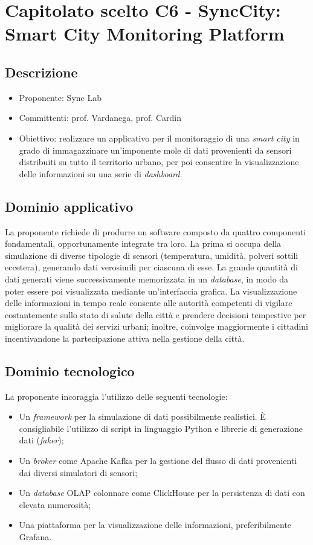 \section{Capitolato scelto C6 - SyncCity: Smart City Monitoring Platform}
\subsection{Descrizione}
\begin{itemize}
    \setlength\itemsep{0em}
    \item Proponente: Sync Lab
    \item Committenti: prof. Vardanega, prof. Cardin
    \item Obiettivo: realizzare un applicativo per il monitoraggio di una \textit{smart city} in grado di immagazzinare un'imponente mole di dati provenienti da sensori distribuiti su tutto il territorio urbano, per poi consentire la visualizzazione delle informazioni su una serie di \textit{dashboard}.
\end{itemize}

\subsection{Dominio applicativo}
La proponente richiede di produrre un software composto da quattro componenti fondamentali, opportunamente integrate tra loro. La prima si occupa della simulazione di diverse tipologie di sensori (temperatura, umidità, polveri sottili eccetera), generando dati verosimili per ciascuna di esse. La grande quantità di dati generati viene successivamente memorizzata in un \textit{database}, in modo da poter essere poi visualizzata mediante un'interfaccia grafica. La visualizzazione delle informazioni in tempo reale consente alle autorità competenti di vigilare costantemente sullo stato di salute della città e prendere decisioni tempestive per migliorare la qualità dei servizi urbani; inoltre, coinvolge maggiormente i cittadini incentivandone la partecipazione attiva nella gestione della città.

\subsection{Dominio tecnologico}
La proponente incoraggia l'utilizzo delle seguenti tecnologie:
\begin{itemize}
    \setlength\itemsep{0em}
    \item Un \textit{framework} per la simulazione di dati possibilmente realistici. È consigliabile l'utilizzo di script in linguaggio Python e librerie di generazione dati (\textit{faker});
    \item Un \textit{broker} come Apache Kafka per la gestione del flusso di dati provenienti dai diversi simulatori di sensori;
    \item Un \textit{database} OLAP colonnare come ClickHouse per la persistenza di dati con elevata numerosità;
    \item Una piattaforma per la visualizzazione delle informazioni, preferibilmente Grafana. 
\end{itemize}

